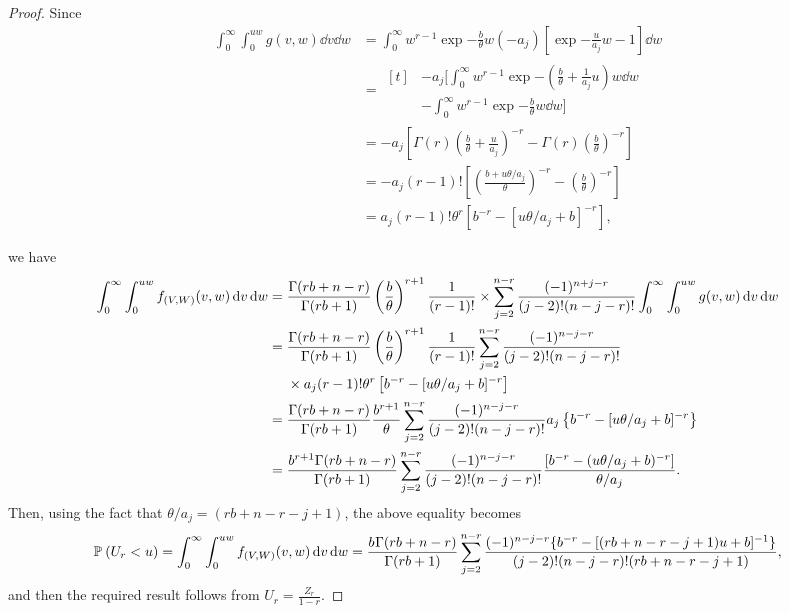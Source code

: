 \documentclass{report}
\begin{document}
\begin{proof}
Since
\begin{align*}
    \int_0^\infty \int_0^{uw} g(v,w) \dd{v}\dd{w} &= \int_0^\infty w^{r-1} \exp{-\frac{b}{\theta}w}(-a_j)\left[\exp{-\frac{u}{a_j}w}-1\right] \dd{w}
    \\
    &= \begin{aligned}[t]
    & -a_j \Bigg[ \int_0^\infty w^{r-1} \exp{- \left( \frac{b}{\theta} + \frac{1}{a_j}u\right)w} \dd{w}
        \\
    &- \int_0^\infty w^{r-1} \exp{- \frac{b}{\theta}w} \dd{w} \Bigg]
    \end{aligned} 
    \\
    &= -a_j \left[\Gamma(r)\left(\frac{b}{\theta} + \frac{u}{a_j}\right)^{-r} - \Gamma(r)\left( \frac{b}{\theta}\right)^{-r} \right]
    \\
    &= -a_j (r-1)! \left[\left(\frac{b + u\theta/a_j}{\theta}\right)^{-r} - \left(\frac{b}{\theta}\right)^{-r}\right]
    \\
    &= a_j (r-1)!\theta^r \left[b^{-r} - [u\theta/a_j + b]^{-r} \right],
\end{align*}

we have
\begin{align*}
    \int_0^\infty \int_0^{uw} f_{(V,W)}(v,w) \dd{v}\dd{w} &=\frac{\Gamma(rb+n-r)}{\Gamma(rb+1)} \left(\frac{b}{\theta}\right)^{r+1} \frac{1}{(r-1)!} \times \sumj[2]{n-r} \frac{(-1)^{n+j-r}}{(j-2)!(n-j-r)!} \int_0^\infty \int_0^{uw} g(v,w) \dd{v}\dd{w}
    \\
     &= \begin{aligned}[t]
        &\frac{\Gamma(rb+n-r)}{\Gamma(rb+1)} \left(\frac{b}{\theta}\right)^{r+1} \frac{1}{(r-1)!} \sumj[2]{n-r} \frac{(-1)^{n-j-r}}{(j-2)!(n-j-r)!}\\
    & \times a_j (r-1)!\theta^r \left[b^{-r} - [u\theta/a_j + b]^{-r} \right]
     \end{aligned}
    \\
    &= \frac{\Gamma(rb+n-r)}{\Gamma(rb+1)} \frac{b^{r+1}}{\theta} \sumj[2]{n-r} \frac{(-1)^{n-j-r}}{(j-2)!(n-j-r)!} a_j \left\{b^{-r} - [u\theta/a_j + b]^{-r} \right\}
    \\
    &=\frac{b^{r+1}\Gamma(rb+n-r)}{\Gamma(rb+1)}  \sumj[2]{n-r} \frac{(-1)^{n-j-r}}{(j-2)!(n-j-r)!} \frac{\left[b^{-r} -(u\theta/a_j + b)^{-r} \right]}{\theta/a_j}.
\end{align*}
Then, using the fact that $\theta/a_j = (rb+n-r-j+1)$, the above equality becomes
\[ 
    \P{U_r < u} = \int_0^\infty \int_0^{uw} f_{(V,W)}(v,w) \dd{v}\dd{w} =  \frac{b^{}\Gamma(rb+n-r)}{\Gamma(rb+1)} \sumj[2]{n-r} \frac{(-1)^{n-j-r}\{b^{-r}  - [(rb+n-r-j+1)u + b]^{-1}\}}{(j-2)!(n-j-r)!(rb+n-r-j+1)},
\]
and then the required result follows from $U_r = \frac{Z_r}{1-r}$.
\end{proof}
\end{document}

